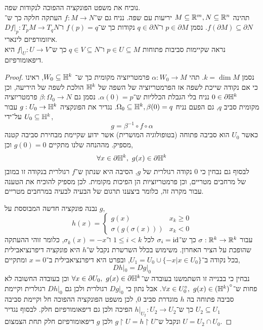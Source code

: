 \question{}
\subquestion{}
נוכיח את משפט הפונקציה ההפוכה לנקודות שפה. \\
תהינה $M \subseteq \mathbb{R}^m, N \subseteq \mathbb{R}^n$ יריעות עם שפה.
נניח גם ש־$f : M \to N$ העתקה חלקה כך ש־$f(\partial M) \subseteq \partial N$.
נסמן $p \in \partial M$ ו־$q \in \partial N$ נקודות כך ש־$f(p) = q$ ו־$D f |_p : T_p M \to T_q N$ איזומורפיזם לינארי. \\
נראה שקיימות סביבות פתוחות $p \in U \subseteq M$ ו־$q \in V \subseteq N$ כך ש־$f |_U : U \to V$ היא דיפאומורפיזם.
\begin{proof}
	נסמן $k = \dim M$.
	תהי $\alpha : W_0 \to M$ פרמטריזציה מקומית כך ש־ $W_0 \subseteq \mathbb{H}^k$, ראינו כי אם נקודה שייכת לשפה אז הפרמטריזציה של השפה של $\mathbb{H}^k$ הולכת לשפה של היריעה, וכן $0 \in \partial \mathbb{H}^k$ נניח בלי הגבלת הכלליות ש־$\alpha(0) = p$.
	נסמן גם $\beta : \Omega_0 \to N$ פרמטריזציה מקומית סביב $q$, גם הפעם נניח $\Omega_0 \subseteq \mathbb{H}^k, \beta(0) = q$.
	נגדיר את הפונקציה $g : U_0 \to \mathbb{H}^k$ עבור $U_0 \subseteq \mathbb{H}^k$ על־ידי,
	\[
		g = \beta^{-1} \circ f \circ \alpha
	\]
	כאשר $U_0$ הוא סביבה פתוחה (בטופולוגיה המושרית) אשר ידוע שקיימת מבחירת סביבה קטנה מספיק.
	מההנחה שלנו מתקיים $g(0) = 0$ וכן,
	\[
		\forall x \in \partial \HH^k,\ 
		g(x) \in \partial \HH^k
	\]
	לבסוף גם נבחין כי $0$ נקודה רגולרית של $g$, הסיבה היא שנתון ש־$f$ רגולרית בנקודה זו במובן של מרחבים מטריים, וכן פרמטריזציות הן הפיכות מקומית.
	לכן מספיק להוכיח את הטענה עבור מקרה זה, כלומר ביצענו תרגום של הבעיה לבעיה במרחבים מטריים.

	נבנה פונקציה חדשה המבוססת על $g$,
	\[
		h(x)
		= \begin{cases}
			g(x) & x_k \ge 0 \\
			\sigma(g(\sigma(x))) & x_k < 0
		\end{cases}
	\]
	עבור $\sigma : \mathbb{R}^k \to \mathbb{R}^k$ כך ש־$\sigma_i = \operatorname{id}$ לכל $1 \le i < k$ ו־$\sigma_k(x) = -x$, כלומר זוהי ההעתקה שהופכת על הציר האחרון.
	משימוש בכלל השרשרת נקבל ש־$h$ היא פונקציה דיפרנציאבילית בכל נקודה ב־$U_1 = U_0 \cup \{ -x | x \in U_0 \}$, ובפרט היא דיפרנציאבילית ב־$x = 0$ ומתקיים,
	\[
		D h |_0
		= D g |_0
	\]
	נבחין כי בבנייה זו השתמשנו בעובדה ש־$\forall x \in \partial U_0,\ g(x) \in \partial \HH^k$ וכן בעובדה החשובה לא פחות ש־$\forall x \in U_0^\circ,\ g(x) \in {(\mathbb{H}^k)}^\circ$.
	אבל נתון כי $D g |_0$ רגולרית ולכן גם $D h |_0$ רגולרית וקיימת סביבה פתוחה בה $h$ מוגדרת סביב $0$, לכן משפט הפונקציה ההפוכה חל וקיימת סביבה $U_2 \subseteq U_1$ כך ש־$h |_{U_2} : U_2 \to U_2$ הפיכה ולכן גם דיפאומורפיזם חלק.
	לבסוף נגדיר $U = U_2 \cap U_0$ ונקבל ש־$g \restriction U = h \restriction U$ ולכן $g$ דיפאומורפיזם חלק תחת הצמצום.
\end{proof}

